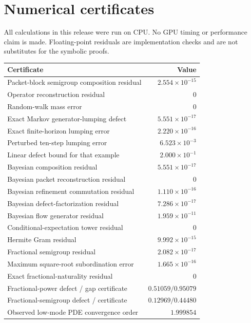 \documentclass[11pt,letterpaper]{article}
\theoremstyle{plain}
\theoremstyle{plain}
\theoremstyle{plain}
\theoremstyle{definition}
\theoremstyle{definition}
\theoremstyle{definition}
\theoremstyle{definition}
\theoremstyle{definition}
\theoremstyle{remark}
\theoremstyle{remark}
\theoremstyle{remark}
\theoremstyle{remark}
\theoremstyle{remark}
\theoremstyle{remark}
\begin{document}
\FloatBarrier
\section{Numerical certificates}\label{core:section:16}

All calculations in this release were run on CPU. No GPU timing or performance claim is made. Floating-point residuals are implementation checks and are not substitutes for the symbolic proofs.

\begin{table}[htbp]
\centering
\small
\begin{tabular}{L{0.56\textwidth} r}
\toprule
Certificate & Value\\
\midrule
Packet-block semigroup composition residual & $2.554\times10^{-15}$\\
Operator reconstruction residual & $0$\\
Random-walk mass error & $0$\\
Exact Markov generator-lumping defect & $5.551\times10^{-17}$\\
Exact finite-horizon lumping error & $2.220\times10^{-16}$\\
Perturbed ten-step lumping error & $6.523\times10^{-3}$\\
Linear defect bound for that example & $2.000\times10^{-1}$\\
Bayesian composition residual & $5.551\times10^{-17}$\\
Bayesian packet reconstruction residual & $0$\\
Bayesian refinement commutation residual & $1.110\times10^{-16}$\\
Bayesian defect-factorization residual & $7.286\times10^{-17}$\\
Bayesian flow generator residual & $1.959\times10^{-11}$\\
Conditional-expectation tower residual & $0$\\
Hermite Gram residual & $9.992\times10^{-15}$\\
Fractional semigroup residual & $2.082\times10^{-17}$\\
Maximum square-root subordination error & $1.665\times10^{-16}$\\
Exact fractional-naturality residual & $0$\\
Fractional-power defect / gap certificate & $0.51059 / 0.95079$\\
Fractional-semigroup defect / certificate & $0.12969 / 0.44480$\\
Observed low-mode PDE convergence order & $1.999854$\\

\end{tabular}
\end{table}
\end{document}
